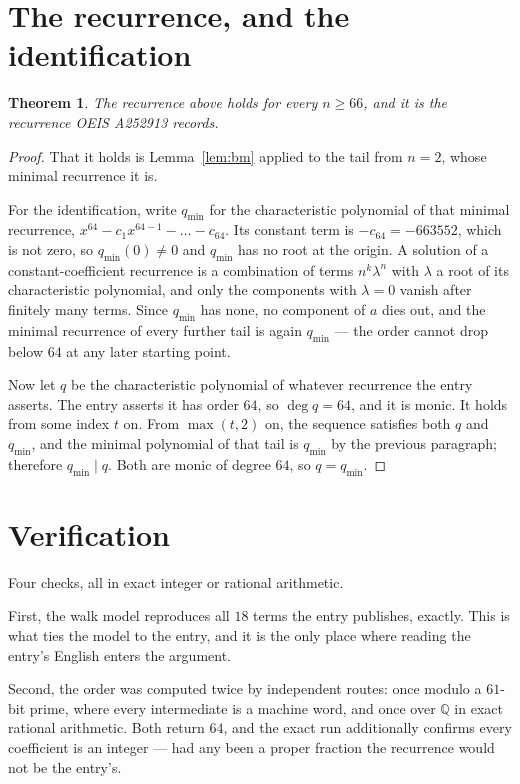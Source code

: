 \documentclass[11pt,a4paper]{article}
\theoremstyle{plain}
\newtheorem{theorem}{Theorem}
\theoremstyle{definition}
\begin{document}
\section{The recurrence, and the identification}

\begin{theorem}
The recurrence above holds for every $n\ge66$, and it is the recurrence OEIS A252913 records.
\end{theorem}

\begin{proof}
That it holds is Lemma~\ref{lem:bm} applied to the tail from $n=2$, whose minimal
recurrence it is.

For the identification, write $q_{\min}$ for the characteristic polynomial of that minimal
recurrence, $x^{64}-c_1x^{64-1}-\dots-c_{64}$. Its constant term is
$-c_{64}=-663552$, which is not zero, so $q_{\min}(0)\neq0$ and $q_{\min}$ has no
root at the origin. A solution of a constant-coefficient recurrence is a combination of terms
$n^{k}\lambda^{n}$ with $\lambda$ a root of its characteristic polynomial, and only the
components with $\lambda=0$ vanish after finitely many terms. Since $q_{\min}$ has none, no
component of $a$ dies out, and the minimal recurrence of every further tail is again
$q_{\min}$ --- the order cannot drop below $64$ at any later starting point.

Now let $q$ be the characteristic polynomial of whatever recurrence the entry asserts. The
entry asserts it has order $64$, so $\deg q=64$, and it is monic. It holds from some
index $t$ on. From $\max(t,2)$ on, the sequence satisfies both $q$ and $q_{\min}$, and
the minimal polynomial of that tail is $q_{\min}$ by the previous paragraph; therefore
$q_{\min}\mid q$. Both are monic of degree $64$, so $q=q_{\min}$.
\end{proof}

\section{Verification}

Four checks, all in exact integer or rational arithmetic.

First, the walk model reproduces all $18$ terms the entry publishes, exactly. This is
what ties the model to the entry, and it is the only place where reading the entry's English
enters the argument.

Second, the order was computed twice by independent routes: once modulo a $61$-bit prime, where
every intermediate is a machine word, and once over $\mathbb{Q}$ in exact rational arithmetic.
Both return $64$, and the exact run additionally confirms every coefficient is an integer
--- had any been a proper fraction the recurrence would not be the entry's.
\end{document}
